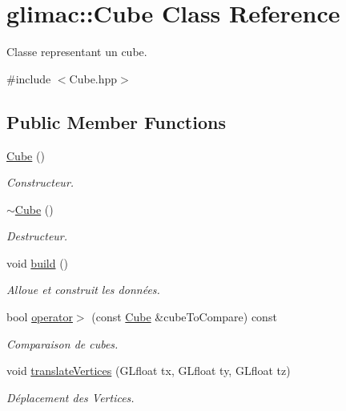 \hypertarget{classglimac_1_1Cube}{}\section{glimac\+:\+:Cube Class Reference}
\label{classglimac_1_1Cube}


Classe representant un cube.  




{\ttfamily \#include $<$Cube.\+hpp$>$}

\subsection*{Public Member Functions}
\begin{DoxyCompactItemize}
\item 
\hyperlink{classglimac_1_1Cube_a801f14f22e31defc97297ee0f3409856}{Cube} ()
\begin{DoxyCompactList}\small\item\em Constructeur. \end{DoxyCompactList}\item 
\hyperlink{classglimac_1_1Cube_a52597e45ce6cd2db132f5d198c2bd33b}{$\sim$\+Cube} ()
\begin{DoxyCompactList}\small\item\em Destructeur. \end{DoxyCompactList}\item 
void \hyperlink{classglimac_1_1Cube_a90a46da5252a79df816f3289ff5910f3}{build} ()
\begin{DoxyCompactList}\small\item\em Alloue et construit les données. \end{DoxyCompactList}\item 
bool \hyperlink{classglimac_1_1Cube_a46cb8692b9572361e283e88913089bad}{operator$>$} (const \hyperlink{classglimac_1_1Cube}{Cube} \&cube\+To\+Compare) const
\begin{DoxyCompactList}\small\item\em Comparaison de cubes. \end{DoxyCompactList}\item 
void \hyperlink{classglimac_1_1Cube_a57a197e614422f798de48546c3a31b86}{translate\+Vertices} (G\+Lfloat tx, G\+Lfloat ty, G\+Lfloat tz)
\begin{DoxyCompactList}\small\item\em Déplacement des Vertices. \end{DoxyCompactList}\item 

\end{DoxyCompactItemize}
